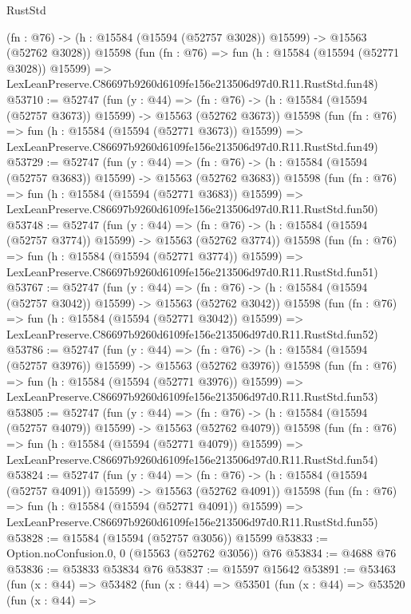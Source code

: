 \begin{lexlean}{RustStd}
\begin{coremodule}
    (fn : @76) -> (h : @15584 (@15594 (@52757 @3028)) @15599) -> @15563 (@52762 @3028))
    @15598
    (fun (fn : @76) =>
    fun (h : @15584 (@15594 (@52771 @3028)) @15599) =>
    LexLeanPreserve.C86697b9260d6109fe156e213506d97d0.R11.RustStd.fun48)
@53710 := @52747
    (fun (y : @44) =>
    (fn : @76) -> (h : @15584 (@15594 (@52757 @3673)) @15599) -> @15563 (@52762 @3673))
    @15598
    (fun (fn : @76) =>
    fun (h : @15584 (@15594 (@52771 @3673)) @15599) =>
    LexLeanPreserve.C86697b9260d6109fe156e213506d97d0.R11.RustStd.fun49)
@53729 := @52747
    (fun (y : @44) =>
    (fn : @76) -> (h : @15584 (@15594 (@52757 @3683)) @15599) -> @15563 (@52762 @3683))
    @15598
    (fun (fn : @76) =>
    fun (h : @15584 (@15594 (@52771 @3683)) @15599) =>
    LexLeanPreserve.C86697b9260d6109fe156e213506d97d0.R11.RustStd.fun50)
@53748 := @52747
    (fun (y : @44) =>
    (fn : @76) -> (h : @15584 (@15594 (@52757 @3774)) @15599) -> @15563 (@52762 @3774))
    @15598
    (fun (fn : @76) =>
    fun (h : @15584 (@15594 (@52771 @3774)) @15599) =>
    LexLeanPreserve.C86697b9260d6109fe156e213506d97d0.R11.RustStd.fun51)
@53767 := @52747
    (fun (y : @44) =>
    (fn : @76) -> (h : @15584 (@15594 (@52757 @3042)) @15599) -> @15563 (@52762 @3042))
    @15598
    (fun (fn : @76) =>
    fun (h : @15584 (@15594 (@52771 @3042)) @15599) =>
    LexLeanPreserve.C86697b9260d6109fe156e213506d97d0.R11.RustStd.fun52)
@53786 := @52747
    (fun (y : @44) =>
    (fn : @76) -> (h : @15584 (@15594 (@52757 @3976)) @15599) -> @15563 (@52762 @3976))
    @15598
    (fun (fn : @76) =>
    fun (h : @15584 (@15594 (@52771 @3976)) @15599) =>
    LexLeanPreserve.C86697b9260d6109fe156e213506d97d0.R11.RustStd.fun53)
@53805 := @52747
    (fun (y : @44) =>
    (fn : @76) -> (h : @15584 (@15594 (@52757 @4079)) @15599) -> @15563 (@52762 @4079))
    @15598
    (fun (fn : @76) =>
    fun (h : @15584 (@15594 (@52771 @4079)) @15599) =>
    LexLeanPreserve.C86697b9260d6109fe156e213506d97d0.R11.RustStd.fun54)
@53824 := @52747
    (fun (y : @44) =>
    (fn : @76) -> (h : @15584 (@15594 (@52757 @4091)) @15599) -> @15563 (@52762 @4091))
    @15598
    (fun (fn : @76) =>
    fun (h : @15584 (@15594 (@52771 @4091)) @15599) =>
    LexLeanPreserve.C86697b9260d6109fe156e213506d97d0.R11.RustStd.fun55)
@53828 := @15584 (@15594 (@52757 @3056)) @15599
@53833 := Option.noConfusion.{0, 0} (@15563 (@52762 @3056)) @76
@53834 := @4688 @76
@53836 := @53833 @53834 @76
@53837 := @15597 @15642
@53891 := @53463
    (fun (x : @44) =>
    @53482
      (fun (x : @44) =>
      @53501
        (fun (x : @44) =>
        @53520
          (fun (x : @44) =>

\end{coremodule}
\end{lexlean}
